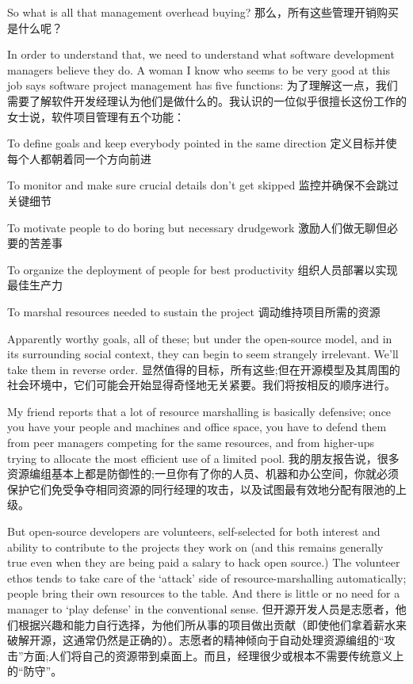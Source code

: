 \documentclass[a4paper,12pt,UTF8,twoside]{ctexbook}
\begin{document}
So what is all that management overhead buying?
那么，所有这些管理开销购买是什么呢？

In order to understand that, we need to understand what software development managers believe they do. A woman I know who seems to be very good at this job says software project management has five functions:
为了理解这一点，我们需要了解软件开发经理认为他们是做什么的。我认识的一位似乎很擅长这份工作的女士说，软件项目管理有五个功能：

To define goals and keep everybody pointed in the same direction
定义目标并使每个人都朝着同一个方向前进

To monitor and make sure crucial details don't get skipped
监控并确保不会跳过关键细节

To motivate people to do boring but necessary drudgework
激励人们做无聊但必要的苦差事

To organize the deployment of people for best productivity
组织人员部署以实现最佳生产力

To marshal resources needed to sustain the project
调动维持项目所需的资源

Apparently worthy goals, all of these; but under the open-source model, and in its surrounding social context, they can begin to seem strangely irrelevant. We'll take them in reverse order.
显然值得的目标，所有这些;但在开源模型及其周围的社会环境中，它们可能会开始显得奇怪地无关紧要。我们将按相反的顺序进行。

My friend reports that a lot of resource marshalling is basically defensive; once you have your people and machines and office space, you have to defend them from peer managers competing for the same resources, and from higher-ups trying to allocate the most efficient use of a limited pool.
我的朋友报告说，很多资源编组基本上都是防御性的;一旦你有了你的人员、机器和办公空间，你就必须保护它们免受争夺相同资源的同行经理的攻击，以及试图最有效地分配有限池的上级。

But open-source developers are volunteers, self-selected for both interest and ability to contribute to the projects they work on (and this remains generally true even when they are being paid a salary to hack open source.) The volunteer ethos tends to take care of the `attack' side of resource-marshalling automatically; people bring their own resources to the table. And there is little or no need for a manager to `play defense' in the conventional sense.
但开源开发人员是志愿者，他们根据兴趣和能力自行选择，为他们所从事的项目做出贡献（即使他们拿着薪水来破解开源，这通常仍然是正确的）。志愿者的精神倾向于自动处理资源编组的“攻击”方面;人们将自己的资源带到桌面上。而且，经理很少或根本不需要传统意义上的“防守”。
\end{document}
